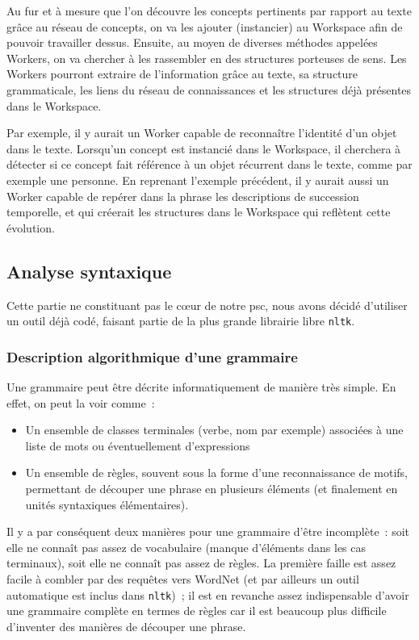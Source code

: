 \documentclass[a4paper, 12pt]{article}
\newcommand{\pyt}[1]{\texttt{#1}}%
\begin{document}
Au fur et à mesure que l'on découvre les concepts pertinents par rapport au texte grâce au réseau de concepts, on va les ajouter (instancier) au Workspace afin de pouvoir travailler dessus. Ensuite, au moyen de diverses méthodes appelées Workers, on va chercher à les rassembler en des structures porteuses de sens. Les Workers pourront extraire de l'information grâce au texte, sa structure grammaticale, les liens du réseau de connaissances et les structures déjà présentes dans le Workspace.

Par exemple, il y aurait un Worker capable de reconnaître l'identité d'un objet dans le texte. Lorsqu'un concept est instancié dans le Workspace, il cherchera à détecter si ce concept fait référence à un objet récurrent dans le texte, comme par exemple une personne.
En reprenant l'exemple précédent, il y aurait aussi un Worker capable de repérer dans la phrase les descriptions de succession temporelle, et qui créerait les structures dans le Workspace qui reflètent cette évolution. 


\subsection{Analyse syntaxique}

Cette partie ne constituant pas le c\oe{}ur de notre psc, nous avons décidé d'utiliser un outil déjà codé, faisant partie de la plus grande librairie libre \pyt{nltk}.

\subsubsection{Description algorithmique d'une grammaire}
Une grammaire peut être décrite informatiquement de manière très simple. En effet, on peut la voir comme~:
\begin{itemize}
	\item Un ensemble de classes terminales (verbe, nom par exemple) associées à une liste de mots ou éventuellement d'expressions
	\item Un ensemble de règles, souvent sous la forme d'une reconnaissance de motifs, permettant de découper une phrase en plusieurs éléments (et finalement en unités syntaxiques élémentaires).
\end{itemize}

Il y a par conséquent deux manières pour une grammaire d'être incomplète~: soit elle ne connaît pas assez de vocabulaire (manque d'éléments dans les cas terminaux), soit elle ne connaît pas assez de règles. La première faille est assez facile à combler par des requêtes vers WordNet (et par ailleurs un outil automatique est inclus dans \pyt{nltk})~; il est en revanche assez indispensable d'avoir une grammaire complète en termes de règles car il est beaucoup plus difficile d'inventer des manières de découper une phrase.
\end{document}
